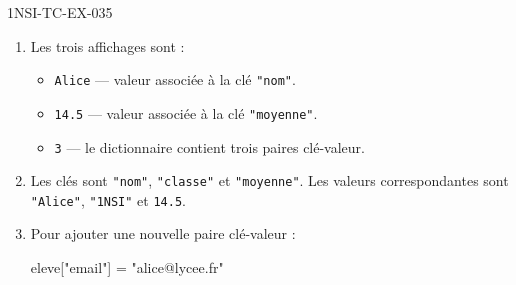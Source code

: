\begin{corrige}{1NSI-TC-EX-035}
\begin{enumerate}
  \item Les trois affichages sont :
  \begin{itemize}
    \item \lstinline{Alice} --- valeur associée à la clé \lstinline{"nom"}.
    \item \lstinline{14.5} --- valeur associée à la clé \lstinline{"moyenne"}.
    \item \lstinline{3} --- le dictionnaire contient trois paires clé-valeur.
  \end{itemize}

  \item Les clés sont \lstinline{"nom"}, \lstinline{"classe"} et \lstinline{"moyenne"}. Les valeurs correspondantes sont \lstinline{"Alice"}, \lstinline{"1NSI"} et \lstinline{14.5}.

  \item Pour ajouter une nouvelle paire clé-valeur :
\begin{python}
eleve["email"] = "alice@lycee.fr"
\end{python}
\end{enumerate}
\end{corrige}

